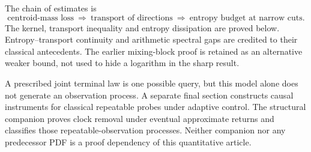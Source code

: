 The chain of estimates is
\[
 \text{centroid-mass loss}\ \Longrightarrow\
 \text{transport of directions}\ \Longrightarrow\
 \text{entropy budget at narrow cuts}.
\]
The kernel, transport inequality and entropy dissipation are proved
below. Entropy--transport continuity and arithmetic spectral gaps are
credited to their classical antecedents. The earlier mixing-block proof
is retained as an alternative weaker bound, not used to hide a
logarithm in the sharp result.

A prescribed joint terminal law is one possible query, but this model
alone does not generate an observation process. A separate final section
constructs causal instruments for classical repeatable probes under
adaptive control. The structural companion proves clock removal under
eventual approximate returns and classifies those repeatable-observation
processes. Neither companion nor any predecessor PDF is a proof
dependency of this quantitative article.
